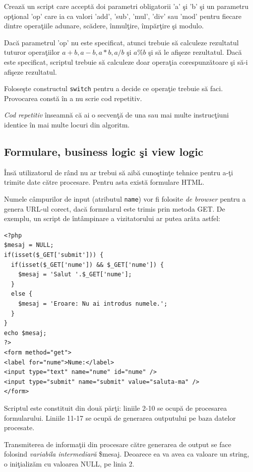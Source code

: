 \begin{Exercise}[title={Un calculator complet},difficulty=2]
Crează un script care acceptă doi parametri obligatorii 'a' şi 'b' şi un parametru
opţional 'op' care ia ca valori 'add', 'sub', 'mul', 'div' sau 'mod' pentru fiecare
dintre operaţiile adunare, scădere, înmulţire, împărţire şi modulo.

Dacă parametrul 'op' nu este specificat, atunci trebuie să calculeze rezultatul
tuturor operaţiilor $a+b,a-b,a*b,a/b$ şi $a\%b$ şi să le afişeze rezultatul. Dacă este
specificat, scriptul trebuie să calculeze doar operaţia corespunzătoare şi
să-i afişeze rezultatul.

Foloseşte constructul \texttt{switch} pentru a decide ce operaţie trebuie să faci.
Provocarea constă în a nu scrie cod repetitiv.

\textit{Cod repetitiv} înseamnă că ai o secvenţă de una sau mai multe instrucţiuni identice
în mai multe locuri din algoritm.
\end{Exercise}

\subsection{Formulare, business logic şi view logic}

Însă utilizatorul de rând nu ar trebui să aibă cunoştinţe tehnice pentru a-ţi
trimite date către procesare. Pentru asta există formulare HTML.

Numele câmpurilor de input (atributul \texttt{name}) vor fi folosite \textit{de browser}
pentru a genera URL-ul corect, dacă formularul este
trimis prin metoda GET. De exemplu, un script de întâmpinare a
vizitatorului ar putea arăta astfel:
\begin{lstlisting}
<?php
$mesaj = NULL;
if(isset($_GET['submit'])) {
  if(isset($_GET['nume']) && $_GET['nume']) {
	$mesaj = 'Salut '.$_GET['nume'];
  }
  else {
	$mesaj = 'Eroare: Nu ai introdus numele.';
  }
}
echo $mesaj;
?>
<form method="get">
<label for="nume">Nume:</label>
<input type="text" name="nume" id="nume" />
<input type="submit" name="submit" value="saluta-ma" />
</form>
\end{lstlisting}
Scriptul este constituit din două părţi: liniile 2-10 se ocupă de procesarea
formularului. Liniile 11-17 se ocupă de generarea outputului pe baza datelor
procesate.

Transmiterea de informaţii din procesare către generarea de output se face
folosind \textsl{variabila intermediară} \$mesaj. Deoarece ea va avea ca valoare un
string, o iniţializăm cu valoarea NULL, pe linia 2.

